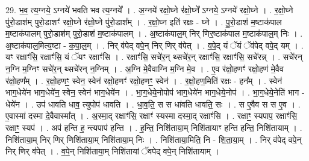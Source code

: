 \documentclass[17pt]{extarticle}
\begin{document}
29. भ॒व॒ त्य॒ग्नये॒ ऽग्नये॑ भवति भव त्य॒ग्नये᳚ । . अ॒ग्नये॑ रक्षो॒घ्ने र॑क्षो॒घ्ने᳚ ऽग्नये॒ ऽग्नये॑ रक्षो॒घ्ने । . र॒क्षो॒घ्ने पु॑रो॒डाश॑म् पुरो॒डाशꣳ॑ रक्षो॒घ्ने र॑क्षो॒घ्ने पु॑रो॒डाश᳚म् । . र॒क्षो॒घ्न इति॑ रक्षः - घ्ने । . पु॒रो॒डाश॑ म॒ष्टाक॑पाल म॒ष्टाक॑पालम् पुरो॒डाश॑म् पुरो॒डाश॑ म॒ष्टाक॑पालम् । . अ॒ष्टाक॑पाल॒म् निर् णिर॒ष्टाक॑पाल म॒ष्टाक॑पाल॒म् निः । . अ॒ष्टाक॑पाल॒मित्य॒ष्टा - क॒पा॒ल॒म् । . निर् व॑पेद् वपे॒न् निर् णिर् व॑पेत् । . व॒पे॒द् यं ॅयं ॅव॑पेद् वपे॒द् यम् । . यꣳ रक्षाꣳ॑सि॒ रक्षाꣳ॑सि॒ यं ॅयꣳ रक्षाꣳ॑सि । . रक्षाꣳ॑सि॒ सचे॑र॒न् थ्सचे॑र॒न् रक्षाꣳ॑सि॒ रक्षाꣳ॑सि॒ सचे॑रन्न् । . सचे॑रन् न॒ग्नि म॒ग्निꣳ सचे॑र॒न् थ्सचे॑रन् न॒ग्निम् । . अ॒ग्नि मे॒वैवाग्नि म॒ग्नि मे॒व । . ए॒व र॑क्षो॒हणꣳ॑ रक्षो॒हण॑ मे॒वैव र॑क्षो॒हण᳚म् । . र॒क्षो॒हणꣳ॒॒ स्वेन॒ स्वेन॑ रक्षो॒हणꣳ॑ रक्षो॒हणꣳ॒॒ स्वेन॑ । . र॒क्षो॒हण॒मिति॑ रक्षः - हन᳚म् । . स्वेन॑ भाग॒धेये॑न भाग॒धेये॑न॒ स्वेन॒ स्वेन॑ भाग॒धेये॑न । . भा॒ग॒धेये॒नोपोप॑ भाग॒धेये॑न भाग॒धेये॒नोप॑ । . भा॒ग॒धेये॒नेति॑ भाग - धेये॑न । . उप॑ धावति धाव॒ त्युपोप॑ धावति । . धा॒व॒ति॒ स स धा॑वति धावति॒ सः । . स ए॒वैव स स ए॒व । . ए॒वास्मा॑ दस्मा दे॒वैवास्मा᳚त् । . अ॒स्मा॒द् रक्षाꣳ॑सि॒ रक्षाꣳ॑ स्यस्मा दस्मा॒द् रक्षाꣳ॑सि । . रक्षाꣳ॒॒ स्यपाप॒ रक्षाꣳ॑सि॒ रक्षाꣳ॒॒ स्यप॑ । . अप॑ हन्ति ह॒ न्त्यपाप॑ हन्ति । . ह॒न्ति॒ निशि॑ताया॒म् निशि॑तायाꣳ हन्ति हन्ति॒ निशि॑तायाम् । . निशि॑ताया॒म् निर् णिर् णिशि॑ताया॒म् निशि॑ताया॒म् निः । . निशि॑ताया॒मिति॒ नि - शि॒ता॒या॒म् । . निर् व॑पेद् वपे॒न् निर् णिर् व॑पेत् । . व॒पे॒न् निशि॑ताया॒म् निशि॑तायां ॅवपेद् वपे॒न् निशि॑तायाम् । \newline
\end{document}
